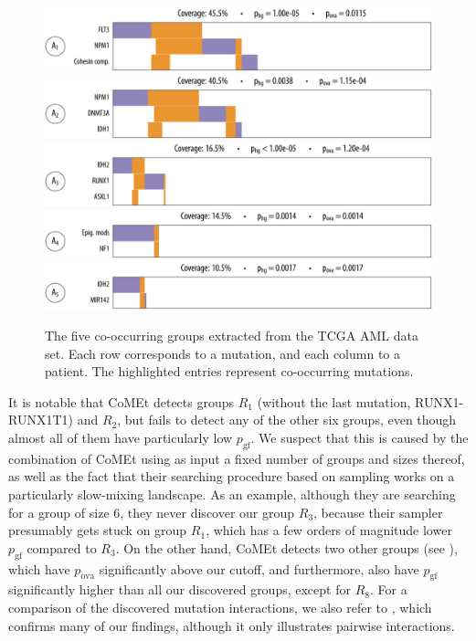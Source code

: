 \begin{figure}[htbp]
\centering
\includegraphics[width=\textwidth]{figures/genes/aml_2_a.pdf}\\[2em]
\includegraphics[width=\textwidth]{figures/genes/aml_1_a.pdf}\\[2em]
\includegraphics[width=\textwidth]{figures/genes/aml_3_a.pdf}\\[2em]
\includegraphics[width=\textwidth]{figures/genes/aml_5_a.pdf}\\[2em]
\includegraphics[width=\textwidth]{figures/genes/aml_4_a.pdf}\\[2em]
\caption{The five co-occurring groups extracted from the TCGA AML data set.
Each row corresponds to a mutation, and each column to a patient.
The highlighted entries represent co-occurring mutations.}
\label{fig:att_aml}
\end{figure}

It is notable that CoMEt detects groups $R_1$ (without the last mutation, \textsf{RUNX1-RUNX1T1}) and $R_2$, but fails to detect any of the other six groups, even though almost all of them have particularly low $p_{\mathrm{gf}}$.
We suspect that this is caused by the combination of CoMEt using as input a fixed number of groups and sizes thereof, as well as the fact that their searching procedure based on sampling works on a particularly slow-mixing landscape.
As an example, although they are searching for a group of size $6$, they never discover our group $R_3$, because their sampler presumably gets stuck on group $R_1$, which has a few orders of magnitude lower $p_{\mathrm{gf}}$ compared to $R_3$.
On the other hand, CoMEt detects two other groups (see ), which have $p_{\mathrm{ova}}$ significantly above our cutoff, and furthermore, also have $p_{\mathrm{gf}}$ significantly higher than all our discovered groups, except for $R_8$.
For a comparison of the discovered mutation interactions, we also refer to \citep[Figure S8]{tcga_aml}, which confirms many of our findings, although it only illustrates pairwise interactions.

